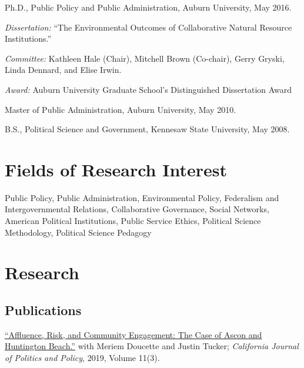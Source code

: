 \documentclass[11pt,letterpaper]{article}
\renewenvironment{itemize}{
  \begin{list}{}{
    \setlength{\leftmargin}{1.5em}
    \setlength{\itemsep}{0.25em}
    \setlength{\parskip}{0pt}
    \setlength{\parsep}{0.25em}
  }
}{
  \end{list}
}
\begin{document}
\begin{itemize}
  \item Ph.D., Public Policy and Public Administration, Auburn University, May 2016.
    \begin{itemize}\leftmargin=2pt\itemindent=-15pt
    \item \emph{Dissertation:} ``The Environmental Outcomes of Collaborative Natural Resource Institutions.'' 
    \item \emph{Committee:} Kathleen Hale (Chair), Mitchell Brown (Co-chair),
	Gerry Gryski, \\Linda Dennard, and Elise Irwin.
	\item \emph{Award:} Auburn University Graduate School's Distinguished Dissertation Award
    \end{itemize}
  \item Master of Public Administration, Auburn University, May 2010.
  \item B.S., Political Science and Government, Kennesaw State University, May 2008.
\end{itemize}

\section*{Fields of Research Interest}

Public Policy, Public Administration, Environmental Policy, Federalism and Intergovernmental Relations, Collaborative Governance, Social Networks, American Political Institutions, Public Service Ethics, Political Science Methodology, Political Science Pedagogy

\section*{Research}

\subsection*{Publications}

\begin{itemize}\leftmargin=2pt\itemindent=-15pt

	\item \href{https://escholarship.org/uc/item/2mz2n6qk}{``Affluence, Risk, and Community Engagement: The Case of Ascon and Huntington Beach.''} with Meriem Doucette and Justin Tucker; \emph{California Journal of Politics and Policy}, 2019, Volume 11(3).
\end{itemize}
\end{document}
